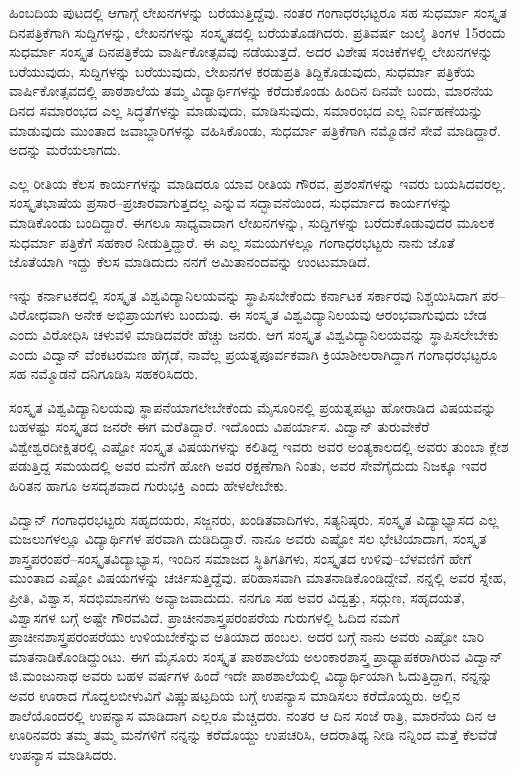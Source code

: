 ಹಿಂಬದಿಯ ಪುಟದಲ್ಲಿ ಆಗಾಗ್ಗೆ ಲೇಖನಗಳನ್ನು ಬರೆಯುತ್ತಿದ್ದೆವು. ನಂತರ ಗಂಗಾಧರಭಟ್ಟರೂ ಸಹ ಸುಧರ್ಮಾ ಸಂಸ್ಕೃತ ದಿನಪತ್ರಿಕೆಗಾಗಿ ಸುದ್ದಿಗಳನ್ನು, ಲೇಖನಗಳನ್ನು ಸಂಸ್ಕೃತದಲ್ಲಿ ಬರೆಯತೊಡಗಿದರು. ಪ್ರತಿವರ್ಷ ಜುಲೈ ತಿಂಗಳ 15ರಂದು ಸುಧರ್ಮಾ ಸಂಸ್ಕೃತ ದಿನಪತ್ರಿಕೆಯ ವಾರ್ಷಿಕೋತ್ಸವವು ನಡೆಯುತ್ತದೆ. ಅದರ ವಿಶೇಷ ಸಂಚಿಕೆಗಳಲ್ಲಿ ಲೇಖನಗಳನ್ನು ಬರೆಯುವುದು, ಸುದ್ದಿಗಳನ್ನು ಬರೆಯುವುದು, ಲೇಖನಗಳ ಕರಡುಪ್ರತಿ ತಿದ್ದಿಕೊಡುವುದು, ಸುಧರ್ಮಾ ಪತ್ರಿಕೆಯ ವಾರ್ಷಿಕೋತ್ಸವದಲ್ಲಿ ಪಾಠಶಾಲೆಯ ತಮ್ಮ ವಿದ್ಯಾರ್ಥಿಗಳನ್ನು ಕರೆದುಕೊಂಡು ಹಿಂದಿನ ದಿನವೇ ಬಂದು, ಮಾರನೆಯ ದಿನದ ಸಮಾರಂಭದ ಎಲ್ಲ ಸಿದ್ಧತೆಗಳನ್ನು ಮಾಡುವುದು, ಮಾಡಿಸುವುದು, ಸಮಾರಂಭದ ಎಲ್ಲ ನಿರ್ವಹಣೆಯನ್ನು ಮಾಡುವುದು ಮುಂತಾದ ಜವಾಬ್ದಾರಿಗಳನ್ನು ವಹಿಸಿಕೊಂಡು, ಸುಧರ್ಮಾ ಪತ್ರಿಕೆಗಾಗಿ ನಮ್ಮೊಡನೆ ಸೇವೆ ಮಾಡಿದ್ದಾರೆ. ಅದನ್ನು ಮರೆಯಲಾಗದು. 

ಎಲ್ಲ ರೀತಿಯ ಕೆಲಸ ಕಾರ್ಯಗಳನ್ನು ಮಾಡಿದರೂ ಯಾವ ರೀತಿಯ ಗೌರವ, ಪ್ರಶಂಸೆಗಳನ್ನು ಇವರು ಬಯಸಿದವರಲ್ಲ. ಸಂಸ್ಕೃತಭಾಷೆಯ ಪ್ರಸಾರ–ಪ್ರಚಾರವಾಗುತ್ತದಲ್ಲ ಎನ್ನುವ ಸದ್ಭಾವನೆಯಿಂದ, ಸುಧರ್ಮಾದ ಕಾರ್ಯಗಳನ್ನು ಮಾಡಿಕೊಂಡು ಬಂದಿದ್ದಾರೆ. ಈಗಲೂ ಸಾಧ್ಯವಾದಾಗ ಲೇಖನಗಳನ್ನು, ಸುದ್ದಿಗಳನ್ನು ಬರೆದುಕೊಡುವುದರ ಮೂಲಕ ಸುಧರ್ಮಾ ಪತ್ರಿಕೆಗೆ ಸಹಕಾರ ನೀಡುತ್ತಿದ್ದಾರೆ. ಈ ಎಲ್ಲ ಸಮಯಗಳಲ್ಲೂ ಗಂಗಾಧರಭಟ್ಟರು ನಾನು ಜೊತೆ ಜೊತೆಯಾಗಿ ಇದ್ದು ಕೆಲಸ ಮಾಡಿದುದು ನನಗೆ ಅಮಿತಾನಂದವನ್ನು ಉಂಟುಮಾಡಿದೆ.

ಇನ್ನು ಕರ್ನಾಟಕದಲ್ಲಿ ಸಂಸ್ಕೃತ ವಿಶ್ವವಿದ್ಯಾನಿಲಯವನ್ನು ಸ್ಥಾಪಿಸಬೇಕೆಂದು ಕರ್ನಾಟಕ ಸರ್ಕಾರವು ನಿಶ್ಚಯಿಸಿದಾಗ ಪರ–ವಿರೋಧವಾಗಿ ಅನೇಕ ಅಭಿಪ್ರಾಯಗಳು ಬಂದುವು. ಈ ಸಂಸ್ಕೃತ ವಿಶ್ವವಿದ್ಯಾನಿಲಯವು ಆರಂಭವಾಗುವುದು ಬೇಡ ಎಂದು ವಿರೋಧಿಸಿ ಚಳುವಳಿ ಮಾಡಿದವರೇ ಹೆಚ್ಚು ಜನರು. ಆಗ ಸಂಸ್ಕೃತ ವಿಶ್ವವಿದ್ಯಾನಿಲಯವನ್ನು ಸ್ಥಾಪಿಸಲೇಬೇಕು ಎಂದು ವಿದ್ವಾನ್ ವೆಂಕಟರಮಣ ಹೆಗ್ಗಡೆ, ನಾವೆಲ್ಲ ಪ್ರಯತ್ನಪೂರ್ವಕವಾಗಿ ಕ್ರಿಯಾಶೀಲರಾಗಿದ್ದಾಗ ಗಂಗಾಧರಭಟ್ಟರೂ ಸಹ ನಮ್ಮೊಡನೆ ದನಿಗೂಡಿಸಿ ಸಹಕರಿಸಿದರು.     

ಸಂಸ್ಕೃತ ವಿಶ್ವವಿದ್ಯಾನಿಲಯವು ಸ್ಥಾಪನೆಯಾಗಲೇಬೇಕೆಂದು ಮೈಸೂರಿನಲ್ಲಿ ಪ್ರಯತ್ನಪಟ್ಟು ಹೋರಾಡಿದ ವಿಷಯವನ್ನು ಬಹಳಷ್ಟು ಸಂಸ್ಕೃತದ ಜನರೇ ಈಗ ಮರೆತಿದ್ದಾರೆ. ಇದೊಂದು ವಿಪರ್ಯಾಸ. ವಿದ್ವಾನ್ ತುರುವೇಕೆರೆ ವಿಶ್ವೇಶ್ವರದೀಕ್ಷಿತರಲ್ಲಿ ಎಷ್ಟೋ ಸಂಸ್ಕೃತ ವಿಷಯಗಳನ್ನು ಕಲಿತಿದ್ದ ಇವರು ಅವರ ಅಂತ್ಯಕಾಲದಲ್ಲಿ ಅವರು ತುಂಬಾ ಕ್ಲೇಶ ಪಡುತ್ತಿದ್ದ ಸಮಯದಲ್ಲಿ ಅವರ ಮನೆಗೆ ಹೋಗಿ ಅವರ ರಕ್ಷಣೆಗಾಗಿ ನಿಂತು, ಅವರ ಸೇವೆಗೈದುದು ನಿಜಕ್ಕೂ ಇವರ ಹಿರಿತನ ಹಾಗೂ ಅಸದೃಶವಾದ ಗುರುಭಕ್ತಿ ಎಂದು ಹೇಳಲೇಬೇಕು.

ವಿದ್ವಾನ್ ಗಂಗಾಧರಭಟ್ಟರು ಸಹೃದಯರು, ಸಜ್ಜನರು, ಖಂಡಿತವಾದಿಗಳು, ಸತ್ಯನಿಷ್ಠರು. ಸಂಸ್ಕೃತ ವಿದ್ಯಾಭ್ಯಾಸದ ಎಲ್ಲ ಮಜಲುಗಳಲ್ಲೂ ವಿದ್ಯಾರ್ಥಿಗಳ ಪರವಾಗಿ ದುಡಿದಿದ್ದಾರೆ. ನಾನೂ ಅವರು ಎಷ್ಟೋ ಸಲ ಭೇಟಿಯಾದಾಗ, ಸಂಸ್ಕೃತ ಶಾಸ್ತ್ರಪರಂಪರೆ–ಸಂಸ್ಕೃತವಿದ್ಯಾಭ್ಯಾಸ, ಇಂದಿನ ಸಮಾಜದ ಸ್ಥಿತಿಗತಿಗಳು, ಸಂಸ್ಕೃತದ ಉಳಿವು–ಬೆಳವಣಿಗೆ ಹೇಗೆ ಮುಂತಾದ ಎಷ್ಟೋ ವಿಷಯಗಳನ್ನು ಚರ್ಚಿಸುತ್ತಿದ್ದೆವು. ಪರಿಹಾಸವಾಗಿ ಮಾತನಾಡಿಕೊಂಡಿದ್ದೇವೆ. ನನ್ನಲ್ಲಿ ಅವರ ಸ್ನೇಹ, ಪ್ರೀತಿ, ವಿಶ್ವಾಸ, ಸದಭಿಮಾನಗಳು ಅವ್ಯಾಜವಾದುದು. ನನಗೂ ಸಹ ಅವರ ವಿದ್ವತ್ತು, ಸದ್ಗುಣ, ಸಹೃದಯತೆ, ವಿಶ್ವಾಸಗಳ ಬಗ್ಗೆ ಅಷ್ಟೇ ಗೌರವವಿದೆ. ಪ್ರಾಚೀನಶಾಸ್ತ್ರಪರಂಪರೆಯ ಗುರುಗಳಲ್ಲಿ ಓದಿದ ನಮಗೆ ಪ್ರಾಚೀನಶಾಸ್ತ್ರಪರಂಪರೆಯು ಉಳಿಯಬೇಕೆನ್ನುವ ಅತಿಯಾದ ಹಂಬಲ. ಅದರ ಬಗ್ಗೆ ನಾನು ಅವರು ಎಷ್ಟೋ ಬಾರಿ ಮಾತನಾಡಿಕೊಂಡಿದ್ದುಂಟು.
\newpage
ಈಗ ಮೈಸೂರು ಸಂಸ್ಕೃತ ಪಾಠಶಾಲೆಯ ಅಲಂಕಾರಶಾಸ್ತ್ರ ಪ್ರಾಧ್ಯಾಪಕರಾಗಿರುವ ವಿದ್ವಾನ್ ಜಿ.ಮಂಜುನಾಥ ಅವರು ಬಹಳ ವರ್ಷಗಳ ಹಿಂದೆ ಇದೇ ಪಾಠಶಾಲೆಯಲ್ಲಿ ವಿದ್ಯಾರ್ಥಿಯಾಗಿ ಓದುತ್ತಿದ್ದಾಗ, ನನ್ನನ್ನು ಅವರ ಊರಾದ ಗೊದ್ದಲಬೀಳುವಿಗೆ ವಿಷ್ಣುಷಟ್ಪದಿಯ ಬಗ್ಗೆ ಉಪನ್ಯಾಸ ಮಾಡಿಸಲು ಕರೆದೊಯ್ದರು. ಅಲ್ಲಿನ ಶಾಲೆಯೊಂದರಲ್ಲಿ ಉಪನ್ಯಾಸ ಮಾಡಿದಾಗ ಎಲ್ಲರೂ ಮೆಚ್ಚಿದರು. ನಂತರ ಆ ದಿನ ಸಂಜೆ ರಾತ್ರಿ, ಮಾರನೆಯ ದಿನ ಆ ಊರಿನವರು ತಮ್ಮ ತಮ್ಮ ಮನೆಗಳಿಗೆ ನನ್ನನ್ನು ಕರೆದೊಯ್ದು ಉಪಚರಿಸಿ, ಆದರಾತಿಥ್ಯ ನೀಡಿ ನನ್ನಿಂದ ಮತ್ತೆ ಕೆಲವೆಡೆ ಉಪನ್ಯಾಸ ಮಾಡಿಸಿದರು. 

